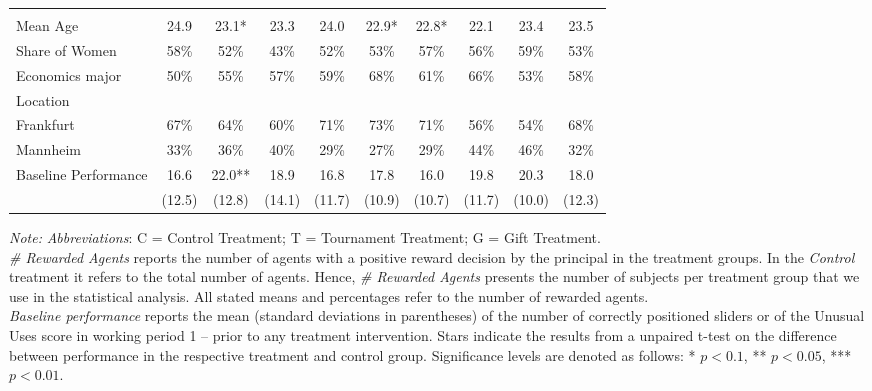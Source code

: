 \begin{landscape}
\begin{table}
\begin{center}
{\begin{tabularx}{\textwidth}{|l|c|c|c|c|c|c||c|c||c|}
 & & & & & & & & & \\
Mean Age  & 24.9& 23.1*& 23.3&24.0 &22.9* &22.8* &  22.1 & 23.4 & 23.5 \\
Share of Women  & 58\% & 52\% & 43\% & 52\%  & 53\%  & 57\%  &56\% &59\% & 53\% \\
Economics major & 50\% & 55\%& 57\%& 59\%&68\% &61\% &66\% &53\% & 58\% \\
Location & & & & & & & & & \\
\hspace{3mm} Frankfurt  & 67\% & 64\% & 60\% & 71\% & 73\%& 71\%& 56\% &54\% & 68\% \\
\hspace{3mm} Mannheim & 33\%& 36\%& 40\% & 29\% & 27\%& 29\%& 44\% & 46\% & 32\% \\
Baseline Performance & 16.6 & 22.0** & 18.9 &16.8  &17.8  &16.0  & 19.8 & 20.3 & 18.0 \\
&(12.5)&(12.8)&(14.1)&(11.7)&(10.9)&(10.7)&(11.7)  & (10.0) & (12.3) \\
\hline
\end{tabularx}}
\begin{minipage}{0.98\linewidth}
\footnotesize
\vspace{5mm}
{\it Note:}\textit{ Abbreviations}: C  =  Control Treatment; T  =  Tournament Treatment; G  =  Gift Treatment.\\ 
 \textit{\# Rewarded Agents} reports the number of agents with a positive reward decision by the principal in the treatment groups. In the \textit{Control} treatment it refers to the total number of agents. Hence, \textit{\# Rewarded Agents} presents the number of subjects per treatment group that we use in the statistical analysis. All stated means and percentages refer to the number of rewarded agents. \\ 
\hspace{3mm}\textit{Baseline performance} reports the mean (standard deviations in parentheses) of the number of correctly positioned sliders or of the Unusual Uses score in working period 1 -- prior to any treatment intervention. 
Stars indicate the results from a unpaired t-test on the difference between performance in the respective treatment and control group. Significance levels are denoted as follows: * $p < 0.1$, ** $p < 0.05$, *** $p < 0.01$.
\end{minipage}
\label{tab:Summary_Statistics}
\end{center}
\end{table}
\end{landscape}
